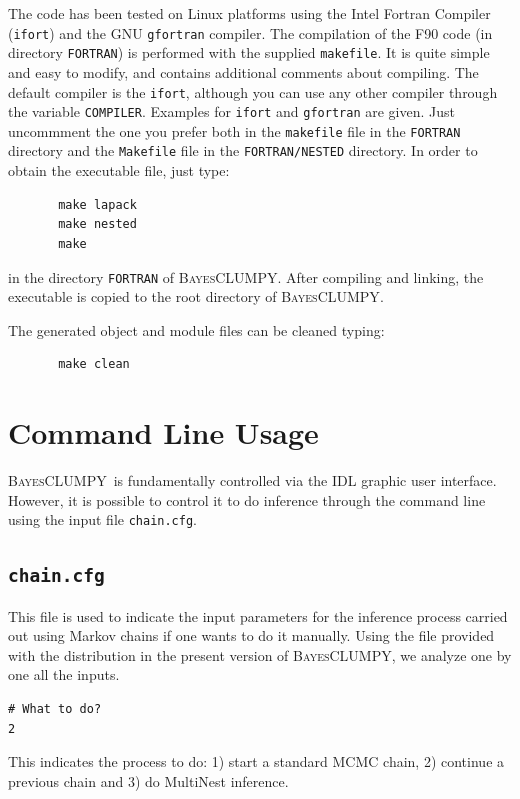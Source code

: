 \documentclass[12pt]{article}
\def\B{\textsc{BayesCLUMPY}}
\begin{document}
The code has been tested on Linux platforms using the Intel Fortran
Compiler (\texttt{ifort}) and the GNU \texttt{gfortran} compiler. The compilation 
of the F90 code (in directory \texttt{FORTRAN}) is performed
with the supplied \texttt{makefile}. It is quite simple and easy to modify, and
contains additional comments about compiling. The
default compiler is the \texttt{ifort}, although you can use any other
compiler through the variable \texttt{COMPILER}. Examples for \texttt{ifort}
and \texttt{gfortran} are given. Just uncommment the one you prefer both in the \texttt{makefile}
file in the \texttt{FORTRAN} directory and the \texttt{Makefile} file in the 
\texttt{FORTRAN/NESTED} directory.
In order to obtain the executable file, just type:
\begin{verbatim}
       make lapack
       make nested  
       make
\end{verbatim}
in the directory \texttt{FORTRAN} of \B. After compiling and linking, the executable is copied to the root directory of
\B.

The generated object and module files can be cleaned typing:
\begin{verbatim}
       make clean
\end{verbatim}

\section{Command Line Usage}
\B\ is fundamentally controlled via the IDL graphic user interface. However, it is
possible to control it to do inference through the command line
using the input file \texttt{chain.cfg}.

\subsection{\texttt{chain.cfg}}
This file is used to indicate the input parameters for the inference process
carried out using Markov chains if one wants to do it manually. Using the file
provided with the distribution in the present version of \B, we analyze one by one all the inputs.

\begin{verbatim}
# What to do?
2
\end{verbatim}
This indicates the process to do: 1) start a standard MCMC chain, 2) continue a previous chain and 3) do
MultiNest inference.
\end{document}
